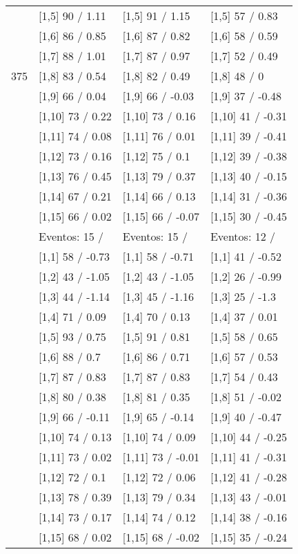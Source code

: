 \begin{table}
\begin{tabular}[t]{llll}
 & {}[1,5] 90  / 1.11 & {}[1,5] 91  / 1.15 & {}[1,5] 57  / 0.83\\
 & {}[1,6] 86  / 0.85 & {}[1,6] 87  / 0.82 & {}[1,6] 58  / 0.59\\
 & {}[1,7] 88  / 1.01 & {}[1,7] 87  / 0.97 & {}[1,7] 52  / 0.49\\
375 & {}[1,8] 83  / 0.54 & {}[1,8] 82  / 0.49 & {}[1,8] 48  / 0\\
\addlinespace
 & {}[1,9] 66  / 0.04 & {}[1,9] 66  / -0.03 & {}[1,9] 37  / -0.48\\
 & {}[1,10] 73  / 0.22 & {}[1,10] 73  / 0.16 & {}[1,10] 41  / -0.31\\
 & {}[1,11] 74  / 0.08 & {}[1,11] 76  / 0.01 & {}[1,11] 39  / -0.41\\
 & {}[1,12] 73  / 0.16 & {}[1,12] 75  / 0.1 & {}[1,12] 39  / -0.38\\
 & {}[1,13] 76  / 0.45 & {}[1,13] 79  / 0.37 & {}[1,13] 40  / -0.15\\
\addlinespace
 & {}[1,14] 67  / 0.21 & {}[1,14] 66  / 0.13 & {}[1,14] 31  / -0.36\\
 & {}[1,15] 66  / 0.02 & {}[1,15] 66  / -0.07 & {}[1,15] 30  / -0.45\\
 & Eventos:  15 / & Eventos:  15 / & Eventos:  12 /\\
 & {}[1,1] 58  / -0.73 & {}[1,1] 58  / -0.71 & {}[1,1] 41  / -0.52\\
 & {}[1,2] 43  / -1.05 & {}[1,2] 43  / -1.05 & {}[1,2] 26  / -0.99\\
\addlinespace
 & {}[1,3] 44  / -1.14 & {}[1,3] 45  / -1.16 & {}[1,3] 25  / -1.3\\
 & {}[1,4] 71  / 0.09 & {}[1,4] 70  / 0.13 & {}[1,4] 37  / 0.01\\
 & {}[1,5] 93  / 0.75 & {}[1,5] 91  / 0.81 & {}[1,5] 58  / 0.65\\
 & {}[1,6] 88  / 0.7 & {}[1,6] 86  / 0.71 & {}[1,6] 57  / 0.53\\
 & {}[1,7] 87  / 0.83 & {}[1,7] 87  / 0.83 & {}[1,7] 54  / 0.43\\
\addlinespace
500 & {}[1,8] 80  / 0.38 & {}[1,8] 81  / 0.35 & {}[1,8] 51  / -0.02\\
 & {}[1,9] 66  / -0.11 & {}[1,9] 65  / -0.14 & {}[1,9] 40  / -0.47\\
 & {}[1,10] 74  / 0.13 & {}[1,10] 74  / 0.09 & {}[1,10] 44  / -0.25\\
 & {}[1,11] 73  / 0.02 & {}[1,11] 73  / -0.01 & {}[1,11] 41  / -0.31\\
 & {}[1,12] 72  / 0.1 & {}[1,12] 72  / 0.06 & {}[1,12] 41  / -0.28\\
\addlinespace
 & {}[1,13] 78  / 0.39 & {}[1,13] 79  / 0.34 & {}[1,13] 43  / -0.01\\
 & {}[1,14] 73  / 0.17 & {}[1,14] 74  / 0.12 & {}[1,14] 38  / -0.16\\
 & {}[1,15] 68  / 0.02 & {}[1,15] 68  / -0.02 & {}[1,15] 35  / -0.24\\
\bottomrule
\end{tabular}
\end{table}
